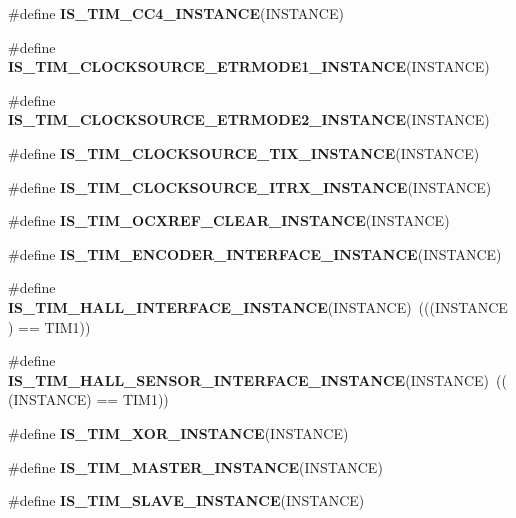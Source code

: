 \begin{DoxyCompactItemize}
\item 
\#define {\bfseries I\+S\+\_\+\+T\+I\+M\+\_\+\+C\+C4\+\_\+\+I\+N\+S\+T\+A\+N\+CE}(I\+N\+S\+T\+A\+N\+CE)
\item 
\#define {\bfseries I\+S\+\_\+\+T\+I\+M\+\_\+\+C\+L\+O\+C\+K\+S\+O\+U\+R\+C\+E\+\_\+\+E\+T\+R\+M\+O\+D\+E1\+\_\+\+I\+N\+S\+T\+A\+N\+CE}(I\+N\+S\+T\+A\+N\+CE)
\item 
\#define {\bfseries I\+S\+\_\+\+T\+I\+M\+\_\+\+C\+L\+O\+C\+K\+S\+O\+U\+R\+C\+E\+\_\+\+E\+T\+R\+M\+O\+D\+E2\+\_\+\+I\+N\+S\+T\+A\+N\+CE}(I\+N\+S\+T\+A\+N\+CE)
\item 
\#define {\bfseries I\+S\+\_\+\+T\+I\+M\+\_\+\+C\+L\+O\+C\+K\+S\+O\+U\+R\+C\+E\+\_\+\+T\+I\+X\+\_\+\+I\+N\+S\+T\+A\+N\+CE}(I\+N\+S\+T\+A\+N\+CE)
\item 
\#define {\bfseries I\+S\+\_\+\+T\+I\+M\+\_\+\+C\+L\+O\+C\+K\+S\+O\+U\+R\+C\+E\+\_\+\+I\+T\+R\+X\+\_\+\+I\+N\+S\+T\+A\+N\+CE}(I\+N\+S\+T\+A\+N\+CE)
\item 
\#define {\bfseries I\+S\+\_\+\+T\+I\+M\+\_\+\+O\+C\+X\+R\+E\+F\+\_\+\+C\+L\+E\+A\+R\+\_\+\+I\+N\+S\+T\+A\+N\+CE}(I\+N\+S\+T\+A\+N\+CE)
\item 
\#define {\bfseries I\+S\+\_\+\+T\+I\+M\+\_\+\+E\+N\+C\+O\+D\+E\+R\+\_\+\+I\+N\+T\+E\+R\+F\+A\+C\+E\+\_\+\+I\+N\+S\+T\+A\+N\+CE}(I\+N\+S\+T\+A\+N\+CE)
\item 
\mbox{\label{group___exported__macro_gacdcc047699e2d83c9d2b3a3f8375dff4}} 
\#define {\bfseries I\+S\+\_\+\+T\+I\+M\+\_\+\+H\+A\+L\+L\+\_\+\+I\+N\+T\+E\+R\+F\+A\+C\+E\+\_\+\+I\+N\+S\+T\+A\+N\+CE}(I\+N\+S\+T\+A\+N\+CE)~(((I\+N\+S\+T\+A\+N\+CE) == T\+I\+M1))
\item 
\mbox{\label{group___exported__macro_ga979ea18ba0931f5ed15cc2f3ac84794b}} 
\#define {\bfseries I\+S\+\_\+\+T\+I\+M\+\_\+\+H\+A\+L\+L\+\_\+\+S\+E\+N\+S\+O\+R\+\_\+\+I\+N\+T\+E\+R\+F\+A\+C\+E\+\_\+\+I\+N\+S\+T\+A\+N\+CE}(I\+N\+S\+T\+A\+N\+CE)~(((I\+N\+S\+T\+A\+N\+CE) == T\+I\+M1))
\item 
\#define {\bfseries I\+S\+\_\+\+T\+I\+M\+\_\+\+X\+O\+R\+\_\+\+I\+N\+S\+T\+A\+N\+CE}(I\+N\+S\+T\+A\+N\+CE)
\item 
\#define {\bfseries I\+S\+\_\+\+T\+I\+M\+\_\+\+M\+A\+S\+T\+E\+R\+\_\+\+I\+N\+S\+T\+A\+N\+CE}(I\+N\+S\+T\+A\+N\+CE)
\item 
\#define {\bfseries I\+S\+\_\+\+T\+I\+M\+\_\+\+S\+L\+A\+V\+E\+\_\+\+I\+N\+S\+T\+A\+N\+CE}(I\+N\+S\+T\+A\+N\+CE)
\item 

\end{DoxyCompactItemize}
